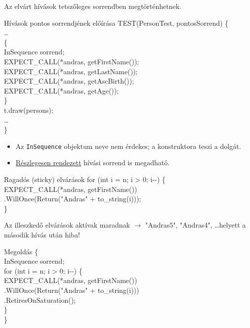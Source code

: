 \documentclass[usenames,dvipsnames,aspectratio=169]{beamer}
\newcommand{\hiv}[1]{{\color{hivatkozasszin}#1}}
\begin{document}
\begin{frame}
    \footnotesize
    Az elvárt hívások tetszőleges sorrendben megtörténhetnek.
    \begin{exampleblock}{Hívások pontos sorrendjének előírása}
        \scriptsize
        TEST(PersonTest, pontosSorrend) \{ \\
        \qquad \dots \\
        \qquad \{ \\
        \qquad\qquad InSequence sorrend; \\
        \smallskip
        \qquad\qquad EXPECT\_CALL(*andras, getFirstName()); \\
        \qquad\qquad EXPECT\_CALL(*andras, getLastName()); \\
        \qquad\qquad EXPECT\_CALL(*andras, getAscBirth()); \\
        \qquad\qquad EXPECT\_CALL(*andras, getAge()); \\
        \qquad \} \\
        \qquad t.draw(persons); \\
        \qquad \dots \\
        \} %
    \end{exampleblock}
    \begin{itemize}
        \item Az \texttt{InSequence} objektum neve nem érdekes; a konstruktora teszi a dolgát.
        \item \hiv{\href{https://google.github.io/googletest/gmock\_cook\_book.html\#PartialOrder}{Részlegesen rendezett}} hívási sorrend is megadható.
    \end{itemize}
\end{frame}

\begin{frame}
    \small
    \begin{exampleblock}{Ragadós (sticky) elvárások}
        \scriptsize
        for (int i = n; i > 0; i-{-}) \{ \\
        \qquad EXPECT\_CALL(*andras, getFirstName()) \\
        \qquad\qquad .WillOnce(Return("Andras" + to\_string(i))); \\
        \}
    \end{exampleblock}
    Az illeszkedő elvárások aktívak maradnak $\to$ "Andras5", "Andras4", \dots helyett a második hívás után hiba!
    \begin{exampleblock}{Megoldás}
        \scriptsize
        \{ \\ %
        \qquad InSequence sorrend; \\
        \smallskip
        \qquad for (int i = n; i > 0; i-{-}) \{ \\
        \qquad\qquad EXPECT\_CALL(*andras, getFirstName()) \\
        \qquad\qquad\qquad .WillOnce(Return("Andras" + to\_string(i))) \\
        \qquad\qquad\qquad .RetiresOnSaturation(); \\
        \qquad \} \\
        \} %
    \end{exampleblock}
\end{frame}
\end{document}
